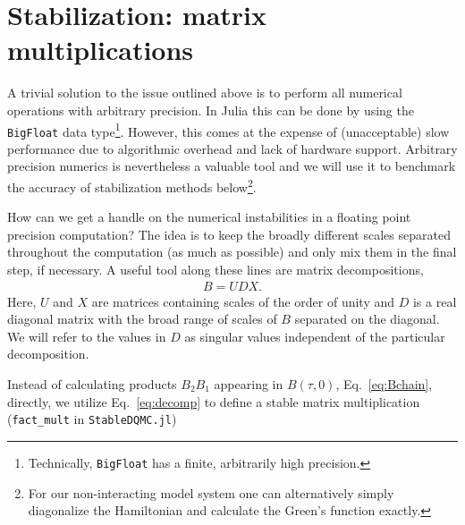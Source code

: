 \documentclass[submission, Phys]{SciPost}
\begin{document}

\section{\label{sec:stabilization}Stabilization: matrix multiplications}

A trivial solution to the issue outlined above is to perform all numerical operations with arbitrary precision. In Julia this can be done by using the \texttt{BigFloat} data type\footnote{Technically, \texttt{BigFloat} has a finite, arbitrarily high precision.}. However, this comes at the expense of (unacceptable) slow performance due to algorithmic overhead and lack of hardware support. Arbitrary precision numerics is nevertheless a valuable tool and we will use it to benchmark the accuracy of stabilization methods below\footnote{For our non-interacting model system one can alternatively simply diagonalize the Hamiltonian and calculate the Green's function exactly.}.


How can we get a handle on the numerical instabilities in a floating point precision computation? The idea is to keep the broadly different scales separated throughout the computation (as much as possible) and only mix them in the final step, if necessary. A useful tool along these lines are matrix decompositions,
\begin{align}
	B = UDX. \label{eq:decomp}
\end{align}
Here, $U$ and $X$ are matrices containing scales of the order of unity and $D$ is a real diagonal matrix with the broad range of scales of $B$ separated on the diagonal. We will refer to the values in $D$ as singular values independent of the particular decomposition.

Instead of calculating products $B_2 B_1$ appearing in $B(\tau, 0)$, Eq.~\ref{eq:Bchain}, directly, we utilize Eq.~\ref{eq:decomp} to define a stable matrix multiplication (\texttt{fact\_mult} in \texttt{StableDQMC.jl})
\end{document}
